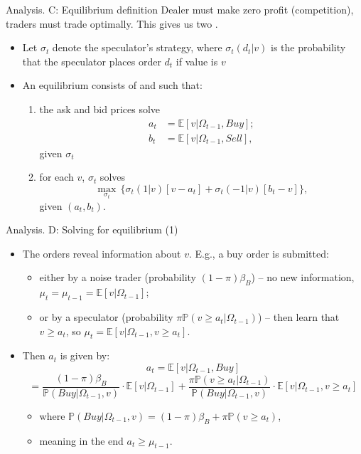 \documentclass[english,10pt]{beamer}
\begin{document}
\begin{frame}{Analysis. C: Equilibrium definition}
Dealer must make zero profit ({competition}), traders must trade optimally.
This gives us two .
\begin{itemize}
	\item Let $\sigma_t$ denote the speculator's strategy, where $\sigma_t(d_t|v)$ is the probability that the speculator places order $d_t$ if value is $v$
	\item \alert{An equilibrium} consists of  and  such that:
	\begin{enumerate}
		\item the ask and bid prices  solve 
		\begin{align*}
		a_t & = \mathbb{E}[v| \Omega_{t-1}, Buy]; \\
		b_t & = \mathbb{E}[v| \Omega_{t-1}, Sell],
		\end{align*}
		given $\sigma_t$
		\item for each $v$, $\sigma_t$ solves 
		\[
		\max_{\sigma_t } \, \{\sigma_t(1|v) [v-a_t] + \sigma_t(-1|v)[b_t-v] \},
		\]
		given $(a_t,b_t)$.
	\end{enumerate} 
\end{itemize}
\end{frame}


\begin{frame}{Analysis. D: Solving for equilibrium (1)}
	\begin{itemize}
		\item The orders reveal information about $v$. E.g., a \alert{buy order} is submitted:
		\begin{itemize}
			\item either by a noise trader (probability $(1-\pi)\beta_B$) -- no new information, $\mu_t = \mu_{t-1} = \mathbb{E}[v|\Omega_{t-1}]$;
			\item or by a speculator (probability $\pi \mathbb{P}(v \geq a_t | \Omega_{t-1})$) -- then learn that $v \geq a_t$, so $\mu_t = \mathbb{E} [v | \Omega_{t-1}, v \geq a_t]$.
		\end{itemize}
		\item Then $a_t$ is given by:
		$$ a_t = \mathbb{E}[v|\Omega_{t-1}, Buy] $$
		$$ = \frac{(1-\pi)\beta_B}{\mathbb{P}(Buy|\Omega_{t-1}, v)} \cdot \mathbb{E}[v|\Omega_{t-1}] + \frac{\pi \mathbb{P}(v \geq a_t | \Omega_{t-1})}{\mathbb{P}(Buy|\Omega_{t-1}, v)} \cdot \mathbb{E} [v | \Omega_{t-1}, v \geq a_t] $$
		\begin{itemize}
			\item where $\mathbb{P}(Buy|\Omega_{t-1}, v) = (1-\pi) \beta_B + \pi \mathbb{P}(v \geq a_t)$,
			\item meaning in the end $a_t \geq \mu_{t-1}$.
		\end{itemize}
	\end{itemize}
\end{frame}
\end{document}
